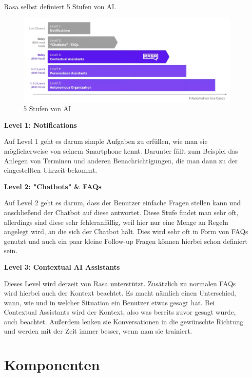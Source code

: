 Rasa selbst definiert 5 Stufen von AI\@.\cite{ai5Levels}

\begin{figure}
  \centering
  \includegraphics[scale=0.25]{pics/5_levels_of_ai}
  \caption{5 Stufen von AI~\cite{ai5LevelsVideo}}
  \label{fig:5_levels_of_ai}
\end{figure}

\textbf{Level 1: Notifications}

Auf Level 1 geht es darum simple Aufgaben zu erfüllen, wie man sie möglicherweise von seinem Smartphone kennt.
Darunter fällt zum Beispiel das Anlegen von Terminen und anderen Benachrichtigungen, die man dann zu der eingestellten Uhrzeit bekommt.\cite{rasaMasterclass5Levels,ai5Levels,ai5LevelsVideo}

\textbf{Level 2: "Chatbots" \& FAQs}

Auf Level 2 geht es darum, dass der Benutzer einfache Fragen stellen kann und anschließend der Chatbot auf diese antwortet.
Diese Stufe findet man sehr oft, allerdings sind diese sehr fehleranfällig, weil hier nur eine Menge an Regeln angelegt wird, an die sich der Chatbot hält.
Dies wird sehr oft in Form von FAQs genutzt und auch ein paar kleine Follow-up Fragen können hierbei schon definiert sein.\cite{rasaMasterclass5Levels,ai5Levels,ai5LevelsVideo}

\textbf{Level 3: Contextual AI Assistants}

Dieses Level wird derzeit von Rasa unterstützt.
Zusätzlich zu normalen FAQs wird hierbei auch der Kontext beachtet.
Es macht nämlich einen Unterschied, wann, wie und in welcher Situation ein Benutzer etwas gesagt hat.
Bei Contextual Assistants wird der Kontext, also was bereits zuvor gesagt wurde, auch beachtet.
Außerdem lenken sie Konversationen in die gewünschte Richtung und werden mit der Zeit immer besser, wenn man sie trainiert.\cite{rasaMasterclass5Levels,ai5Levels,ai5LevelsVideo}

\section{Komponenten}

